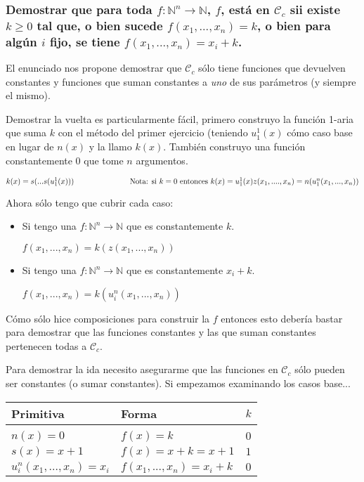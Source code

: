 \documentclass[11pt]{article} %
\newlength{\desarrollolen}
\newcommand{\desarrollo}[2][3em]{

    \hspace{2em}
    \addtolength{\desarrollolen}{-#1}
    \begin{minipage}{\desarrollolen}
        #2
    \end{minipage}
    \addtolength{\desarrollolen}{#1}

}
\newcommand{\nat}{\mathbb{N}}
\newcommand{\Ccur}{\mathcal{C}}
\begin{document}
\subsubsection{Demostrar que para toda $f: \nat^n \to \nat$, $f$, está en $\Ccur_c$ sii existe $k \geq 0$ tal que, o bien sucede $f(x_1, ..., x_n) = k$, o bien para algún $i$ fijo, se tiene $f(x_1, ..., x_n) = x_i + k$.}

El enunciado nos propone demostrar que $\Ccur_c$ sólo tiene funciones que devuelven constantes y funciones que suman constantes a \emph{uno} de sus parámetros (y siempre el mismo).

Demostrar la vuelta es particularmente fácil, primero construyo la función 1-aria que suma $k$ con el método del primer ejercicio (teniendo $u^1_1(x)$ cómo caso base en lugar de $n(x)$ y la llamo $k(x)$. También construyo una función constantemente 0 que tome $n$ argumentos.
\desarrollo{$
k(x) = s(...s(u^1_1(x))) \text{\hspace{7em} Nota: si $k=0$ entonces } k(x)=u^1_1(x) \\
z(x_1, ...., x_n) = n(u^n_1(x_1, ..., x_n))
$}

Ahora sólo tengo que cubrir cada caso:
\begin{itemize}
\item Si tengo una $f: \nat^n \to \nat$ que es constantemente $k$.
\desarrollo[6em]{$ f(x_1, ..., x_n) = k(z(x_1, ..., x_n)) $}
\item Si tengo una $f: \nat^n \to \nat$ que es constantemente $x_i + k$.
\desarrollo[6em]{$ f(x_1, ..., x_n) = k(u^n_i(x_1,...,x_n)) $}
\end{itemize}

Cómo sólo hice composiciones para construir la $f$ entonces esto debería bastar para demostrar que las funciones constantes y las que suman constantes pertenecen todas a $\Ccur_c$.

Para demostrar la ida necesito asegurarme que las funciones en $\Ccur_c$ sólo pueden ser constantes (o sumar constantes). Si empezamos examinando los casos base...
\desarrollo{
\begin{tabular}{lll}
Primitiva                  & Forma                        & $k$ \\ \hline \\[-1em]
$n(x)=0$                   & $f(x) = k$                   & $0$ \\
$s(x)=x+1$                 & $f(x) = x + k = x + 1$       & $1$ \\
$u^n_i(x_1, ..., x_n)=x_i$ & $f(x_1, ..., x_n) = x_i + k$ & $0$
\end{tabular}
}
\end{document}
